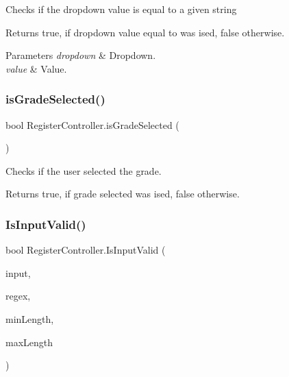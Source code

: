 Checks if the dropdown value is equal to a given string 

\begin{DoxyReturn}{Returns}
{\ttfamily true}, if dropdown value equal to was ised, {\ttfamily false} otherwise.
\end{DoxyReturn}

\begin{DoxyParams}{Parameters}
{\em dropdown} & Dropdown.\\
\hline
{\em value} & Value.\\
\hline
\end{DoxyParams}
\mbox{\label{classRegisterController_a63d41cc83568f2a3aa0159acf51bf265}} 
\subsubsection{\texorpdfstring{is\+Grade\+Selected()}{isGradeSelected()}}
{\footnotesize\ttfamily bool Register\+Controller.\+is\+Grade\+Selected (\begin{DoxyParamCaption}{ }\end{DoxyParamCaption})\hspace{0.3cm}{\ttfamily [inline]}}



Checks if the user selected the grade. 

\begin{DoxyReturn}{Returns}
{\ttfamily true}, if grade selected was ised, {\ttfamily false} otherwise.
\end{DoxyReturn}
\mbox{\label{classRegisterController_a962585ca46ff0707c3ca32d5300c5716}} 
\subsubsection{\texorpdfstring{Is\+Input\+Valid()}{IsInputValid()}}
{\footnotesize\ttfamily bool Register\+Controller.\+Is\+Input\+Valid (\begin{DoxyParamCaption}\item[{Input\+Field}]{input,  }\item[{string}]{regex,  }\item[{int}]{min\+Length,  }\item[{int}]{max\+Length }\end{DoxyParamCaption})\hspace{0.3cm}{\ttfamily [inline]}}



